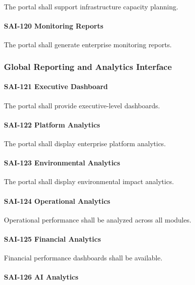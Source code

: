 The portal shall support infrastructure capacity planning.

\paragraph{SAI-120 Monitoring Reports}

The portal shall generate enterprise monitoring reports.


\subsubsection*{Global Reporting and Analytics Interface}

\paragraph{SAI-121 Executive Dashboard}

The portal shall provide executive-level dashboards.

\paragraph{SAI-122 Platform Analytics}

The portal shall display enterprise platform analytics.

\paragraph{SAI-123 Environmental Analytics}

The portal shall display environmental impact analytics.

\paragraph{SAI-124 Operational Analytics}

Operational performance shall be analyzed across all modules.

\paragraph{SAI-125 Financial Analytics}

Financial performance dashboards shall be available.

\paragraph{SAI-126 AI Analytics}

